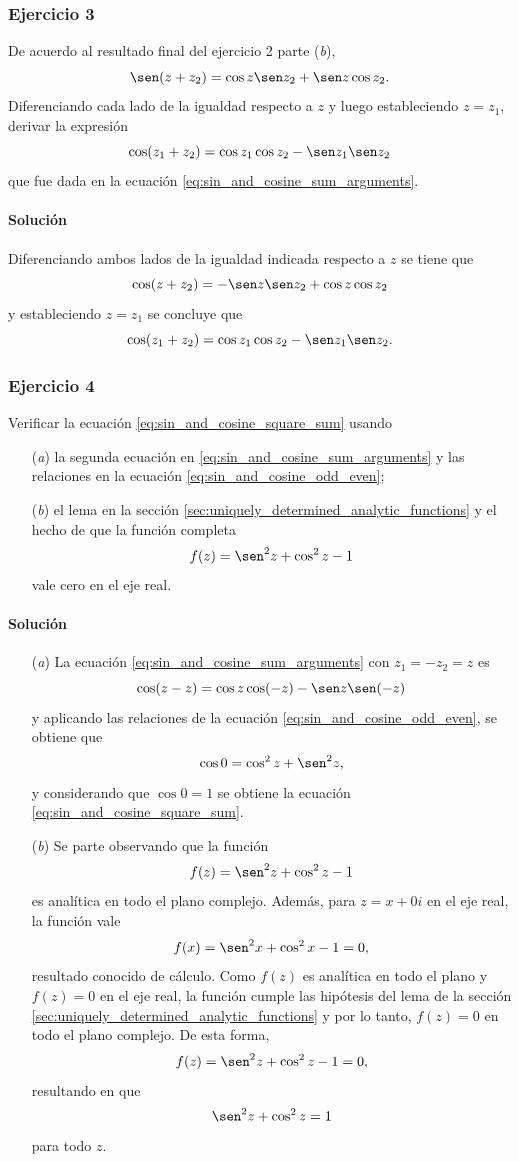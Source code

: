 \documentclass[a4paper]{report}
\begin{document}
\subsubsection{Ejercicio 3}

De acuerdo al resultado final del ejercicio 2 parte (\textit{b}),
\[
 \sen(z+z_2)=\cos z\sen z_2+\sen z\cos z_2.
\]
Diferenciando cada lado de la igualdad respecto a \(z\) y luego estableciendo \(z=z_1\), derivar la expresión 
\[
 \cos(z_1+z_2)=\cos z_1\cos z_2-\sen z_1\sen z_2
\]
que fue dada en la ecuación \ref{eq:sin_and_cosine_sum_arguments}.

\paragraph{Solución} Diferenciando ambos lados de la igualdad indicada respecto a \(z\) se tiene que 
\[
 \cos(z+z_2)=-\sen z\sen z_2+\cos z\cos z_2
\]
y estableciendo \(z=z_1\) se concluye que 
\[
 \cos(z_1+z_2)=\cos z_1\cos z_2-\sen z_1\sen z_2.
\]

\subsubsection{Ejercicio 4}

Verificar la ecuación \ref{eq:sin_and_cosine_square_sum} usando
\begin{enumerate}
 \item[(\textit{a})] la segunda ecuación en \ref{eq:sin_and_cosine_sum_arguments} y las relaciones en la ecuación \ref{eq:sin_and_cosine_odd_even};
 \item[(\textit{b})] el lema en la sección \ref{sec:uniquely_determined_analytic_functions} y el hecho de que la función completa
 \[
  f(z)=\sen^2z+\cos^2z-1
 \]
 vale cero en el eje real.
\end{enumerate}

\paragraph{Solución} 

\begin{enumerate}
 \item[(\textit{a})] La ecuación \ref{eq:sin_and_cosine_sum_arguments} con \(z_1=-z_2=z\) es 
 \[
  \cos(z-z)=\cos z\cos(-z)-\sen z\sen(-z)
 \]
 y aplicando las relaciones de la ecuación \ref{eq:sin_and_cosine_odd_even}, se obtiene que 
 \[
  \cos0=\cos^2z+\sen^2z,
 \]
 y considerando que \(\cos0=1\) se obtiene la ecuación \ref{eq:sin_and_cosine_square_sum}.
 \item[(\textit{b})] Se parte observando que la función 
 \[
  f(z)=\sen^2z+\cos^2z-1
 \]
 es analítica en todo el plano complejo. Además, para \(z=x+0i\) en el eje real, la función vale
 \[
  f(x)=\sen^2x+\cos^2x-1=0,
 \]
 resultado conocido de cálculo. Como \(f(z)\) es analítica en todo el plano y \(f(z)=0\) en el eje real, la función cumple las hipótesis del lema de la sección \ref{sec:uniquely_determined_analytic_functions} y por lo tanto, \(f(z)=0\) en todo el plano complejo. De esta forma,
 \[
  f(z)=\sen^2z+\cos^2z-1=0,
 \]
 resultando en que 
 \[
  \sen^2z+\cos^2z=1
 \]
 para todo \(z\).
\end{enumerate}
\end{document}
